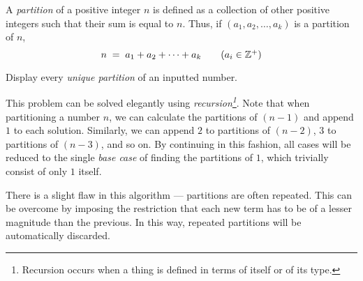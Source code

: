 

\problem A {\em partition} of a positive integer $n$ is defined as a collection of other positive integers such that
their sum is equal to $n$. Thus, if $(a_1, a_2, \dots, a_k)$ is a partition of $n$,
\begin{equation*}
	n	\;=\;	a_1 + a_2 + \dots + a_k 			\tag{$a_i \in \mathbb{Z}^{+}$}
\end{equation*}

Display every {\em unique partition} of an inputted number.

\solution This problem can be solved elegantly using {\em recursion\footnote{Recursion occurs when a thing is defined in terms of itself or of its type.}}. Note that when partitioning a number $n$, we can calculate the partitions of $(n - 1)$ and append $1$ to each solution. Similarly, we can append $2$ to partitions of $(n - 2)$, $3$ to partitions of $(n - 3)$, and so on. By continuing in this fashion, all cases will be reduced to the single {\em base case} of finding the partitions of $1$, which trivially consist of only $1$ itself.

There is a slight flaw in this algorithm --- partitions are often repeated. This can be overcome by imposing the restriction that each new term has to be of a lesser magnitude than the previous. In this way, repeated partitions will be automatically discarded.

\sourcecode
